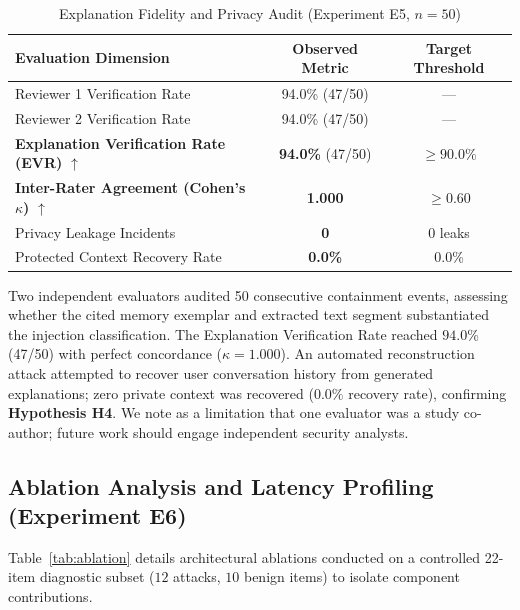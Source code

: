 \documentclass[conference]{IEEEtran}
\begin{document}
\begin{table}[t]
\centering
\caption{Explanation Fidelity and Privacy Audit (Experiment E5, $n=50$)}
\label{tab:explanation}
\begin{tabular}{l c c}
\hline
\textbf{Evaluation Dimension} & \textbf{Observed Metric} & \textbf{Target Threshold} \\
\hline
Reviewer 1 Verification Rate & 94.0\% (47/50) & --- \\
Reviewer 2 Verification Rate & 94.0\% (47/50) & --- \\
\textbf{Explanation Verification Rate (EVR)} $\uparrow$ & \textbf{94.0\%} (47/50) & $\ge 90.0\%$ \\
\textbf{Inter-Rater Agreement (Cohen's $\kappa$)} $\uparrow$ & \textbf{1.000} & $\ge 0.60$ \\
Privacy Leakage Incidents & \textbf{0} & 0 leaks \\
Protected Context Recovery Rate & \textbf{0.0\%} & 0.0\% \\
\hline
\end{tabular}
\end{table}

Two independent evaluators audited 50 consecutive containment events, assessing whether the cited memory exemplar and extracted text segment substantiated the injection classification. The Explanation Verification Rate reached $94.0\%$ (47/50) with perfect concordance ($\kappa = 1.000$). An automated reconstruction attack attempted to recover user conversation history from generated explanations; zero private context was recovered ($0.0\%$ recovery rate), confirming \textbf{Hypothesis H4}. We note as a limitation that one evaluator was a study co-author; future work should engage independent security analysts.

\subsection{Ablation Analysis and Latency Profiling (Experiment E6)}
Table~\ref{tab:ablation} details architectural ablations conducted on a controlled 22-item diagnostic subset ($12$ attacks, $10$ benign items) to isolate component contributions.
\end{document}
